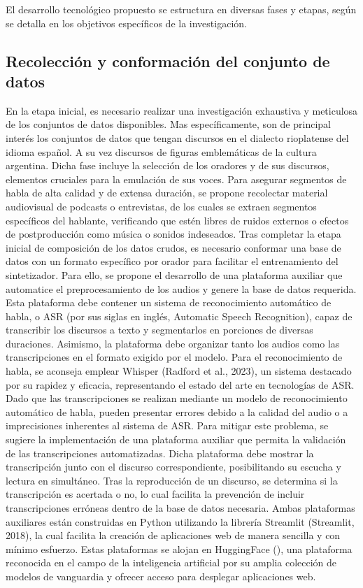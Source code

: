 El desarrollo tecnológico propuesto se estructura en diversas fases y etapas, según se detalla en los objetivos específicos de la investigación. 

\subsection{Recolección y conformación del conjunto de datos}

En la etapa inicial, es necesario realizar una investigación exhaustiva y meticulosa de los conjuntos de datos disponibles. Mas específicamente, son de principal interés los conjuntos de datos que tengan discursos en el dialecto rioplatense del idioma español.
A su vez
discursos de figuras emblemáticas de la cultura argentina. Dicha fase incluye la selección de los oradores y de sus discursos, elementos cruciales para la emulación de sus voces. Para asegurar segmentos de habla de alta calidad y de extensa duración, se propone recolectar material audiovisual de podcasts o entrevistas, de los cuales se extraen segmentos específicos del hablante, verificando que estén libres de ruidos externos o efectos de postproducción como música o sonidos indeseados.
Tras completar la etapa inicial de composición de los datos crudos, es necesario conformar una base de datos con un formato específico por orador para facilitar el entrenamiento del sintetizador. Para ello, se propone el desarrollo de una plataforma auxiliar que automatice el preprocesamiento de los audios y genere la base de datos requerida. Esta plataforma debe contener un sistema de reconocimiento automático de habla, o ASR (por sus siglas en inglés, Automatic Speech Recognition), capaz de transcribir los discursos a texto y segmentarlos en porciones de diversas duraciones. Asimismo, la plataforma debe organizar tanto los audios como las transcripciones en el formato exigido por el modelo. Para el reconocimiento de habla, se aconseja emplear Whisper (Radford et al., 2023), un sistema destacado por su rapidez y eficacia, representando el estado del arte en tecnologías de ASR.
Dado que las transcripciones se realizan mediante un modelo de reconocimiento automático de habla, pueden presentar errores debido a la calidad del audio o a imprecisiones inherentes al sistema de ASR. Para mitigar este problema, se sugiere la implementación de una plataforma auxiliar que permita la validación de las transcripciones automatizadas. Dicha plataforma debe mostrar la transcripción junto con el discurso correspondiente, posibilitando su escucha y lectura en simultáneo. Tras la reproducción de un discurso, se determina si la transcripción es acertada o no, lo cual facilita la prevención de incluir transcripciones erróneas dentro de la base de datos necesaria.
Ambas plataformas auxiliares están construidas en Python utilizando la librería Streamlit (Streamlit, 2018), la cual facilita la creación de aplicaciones web de manera sencilla y con mínimo esfuerzo. Estas plataformas se alojan en HuggingFace (\cite{huggingface}), una plataforma reconocida en el campo de la inteligencia artificial por su amplia colección de modelos de vanguardia y ofrecer acceso para desplegar aplicaciones web.

